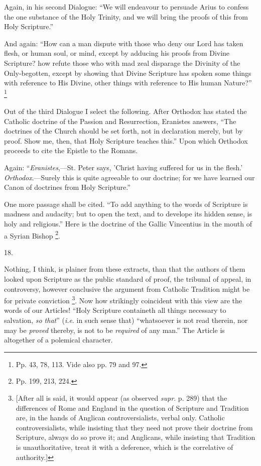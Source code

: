 Again, in his second Dialogue: ``We will endeavour to persuade
Arius to confess the one substance of the Holy Trinity, and we will
bring the proofs of this from Holy Scripture.''

And again: ``How can a man dispute with those who deny our Lord
has taken flesh, or human soul, or mind, except by adducing his proofs
from Divine Scripture? how refute those who with mad zeal
disparage the Divinity of the Only-begotten, except by showing that
Divine Scripture has spoken some things with reference to His Divine,
other things with reference to His human Nature?'' \footnote{Pp. 43, 78, 113. Vide also pp. 79 and 97.}

Out of the third Dialogue I select the following. After Orthodox
has stated the Catholic doctrine of the Passion and Resurrection,
Eranistes answers, ``The doctrines of the Church should be set
forth, not in declaration merely, but by proof. Show me, then, that
Holy Scripture teaches this.'' Upon which Orthodox proceeds to
cite the Epistle to the Romans.

Again: ``\emph{Eranistes},—St. Peter says, 'Christ having
suffered for us in the flesh.' \emph{Orthodox}.—Surely this is quite
agreeable to our doctrine; for we have learned our Canon of doctrines
from Holy Scripture.''

One more passage shall be cited. ``To add anything to the words
of Scripture is madness and audacity; but to open the text, and to
develope its hidden sense, is holy and religious.'' Here is the
doctrine of the Gallic Vincentius in the mouth of a Syrian Bishop \footnote{Pp. 199, 213, 224.}.

18.

Nothing, I think, is plainer from these extracts, than that the
authors of them looked upon Scripture as the public standard of proof,
the tribunal of appeal, in controversy, however conclusive the
argument from Catholic Tradition might be for private conviction \footnote{[After all is said, it would appear (as observed \emph{supr}.
p. 289) that the differences of Rome and England in the question of
Scripture and Tradition are, in the hands of Anglican
controversialists, verbal only. Catholic controversialists, while
insisting that they need not prove their doctrine from Scripture,
always do so prove it; and Anglicans, while insisting that Tradition
is unauthoritative, treat it with a deference, which is the
correlative of authority.]}. Now how strikingly coincident with this view are the words
of our Articles! ``Holy Scripture containeth all things necessary
to salvation, \emph{so that}'' (\emph{i.e}. in such sense that)
``whatsoever is not read therein, nor may be \emph{proved}
thereby, is not to be \emph{required} of any man.'' The Article is
altogether of a polemical character.

